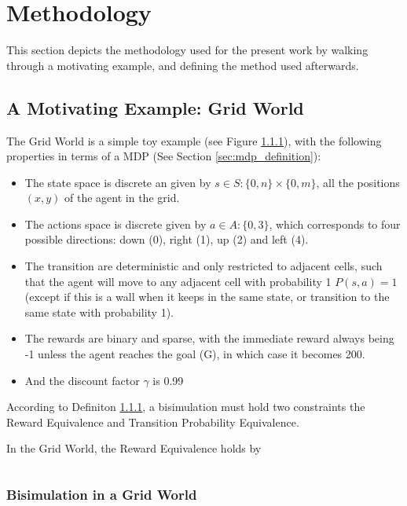 
\chapter{Methodology}

This section depicts the methodology used for the present work by walking through a motivating example, and defining the method used afterwards.


\section{A Motivating Example: Grid World}

The Grid World is a simple toy example (see Figure \ref{}), with the following properties in terms of a MDP (See Section \ref{sec:mdp_definition}):

\begin{itemize}
    \item The state space is discrete an given by $ s \in S : \{0,n\} \times \{0,m\}$, all the positions $(x,y)$ of the agent in the grid.
    \item The actions space is discrete given by $a \in A: \{0,3\}$, which corresponds to four possible directions: down (0), right (1), up (2) and left (4).
    \item The transition are deterministic and only restricted to adjacent cells, such that the agent will move to any adjacent cell with probability 1 $P(s,a) = 1$ (except if this is a wall when it keeps in the same state, or transition to the same state with probability 1).
    \item The rewards are binary and sparse, with the immediate reward always being -1 unless the agent reaches the goal (G), in which case it becomes 200.
    \item And the discount factor $\gamma$ is 0.99
\end{itemize}

According to Definiton \ref{}, a bisimulation must hold two constraints the Reward Equivalence and Transition Probability Equivalence. 



In the Grid World, the Reward Equivalence holds by

$$$$


\subsection{Bisimulation in a Grid World}

